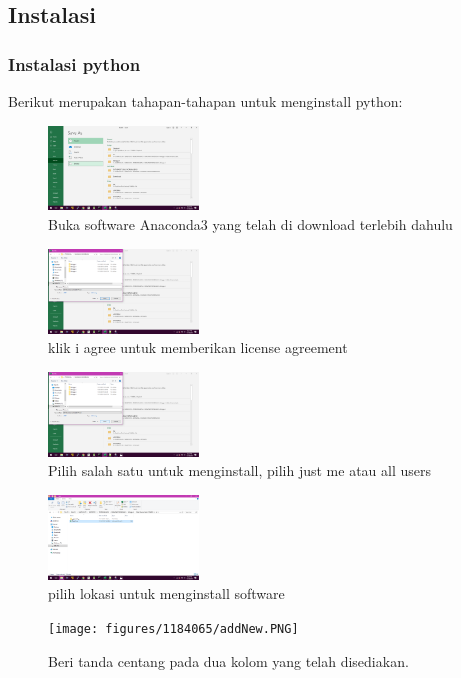 \subsection{Instalasi}
\subsubsection{Instalasi python}
Berikut merupakan tahapan-tahapan untuk menginstall python:
	\begin{figure}[H]
		\includegraphics[width=4cm]{figures/1184065/4.PNG}
		\centering
		\caption{Buka software Anaconda3 yang telah di download terlebih dahulu}
	\end{figure}
	\begin{figure}[H]
		\includegraphics[width=4cm]{figures/1184065/5.PNG}
		\centering
		\caption{klik i agree untuk memberikan license agreement}
	\end{figure}
	\begin{figure}[H]
		\includegraphics[width=4cm]{figures/1184065/6.PNG}
		\centering
		\caption{Pilih salah satu untuk menginstall, pilih just me atau all users}
	\end{figure}
	\begin{figure}[H]
		\includegraphics[width=4cm]{figures/1184065/7.PNG}
		\centering
		\caption{pilih lokasi untuk menginstall software }
	\end{figure}
	\begin{figure}[H]
		\texttt{[image: figures/1184065/addNew.PNG]}
		\centering
		\caption{Beri tanda centang pada dua kolom yang telah disediakan. }
	\end{figure}
